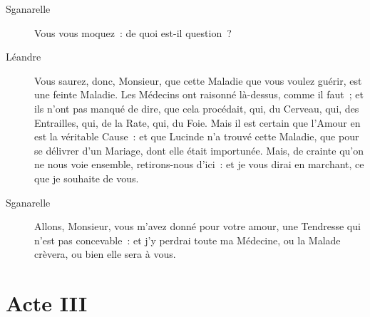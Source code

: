 \documentclass[french,twoside]{book} %
\begin{document}
 \begin{description} \item[Sganarelle] 

Vous vous moquez : de quoi est-il question ?\end{description}
 \begin{description} \item[Léandre] 

Vous saurez, donc, Monsieur, que cette Maladie que vous voulez guérir, est une feinte Maladie. Les Médecins ont raisonné là-dessus, comme il faut ; et ils n’ont pas manqué de dire, que cela procédait, qui, du Cerveau, qui, des Entrailles, qui, de la Rate, qui, du Foie. Mais il est certain que l’Amour en est la véritable Cause : et que Lucinde n’a trouvé cette Maladie, que pour se délivrer d’un Mariage, dont elle était importunée. Mais, de crainte qu’on ne nous voie ensemble, retirons-nous d’ici : et je vous dirai en marchant, ce que je souhaite de vous.\end{description}
 \begin{description} \item[Sganarelle] 

Allons, Monsieur, vous m’avez donné pour votre amour, une Tendresse qui n’est pas concevable : et j’y perdrai toute ma Médecine, ou la Malade crèvera, ou bien elle sera à vous.\end{description}
\section[{Acte III}]{Acte III}
\label{III}\renewcommand{\leftmark}{Acte III}
\end{document}
